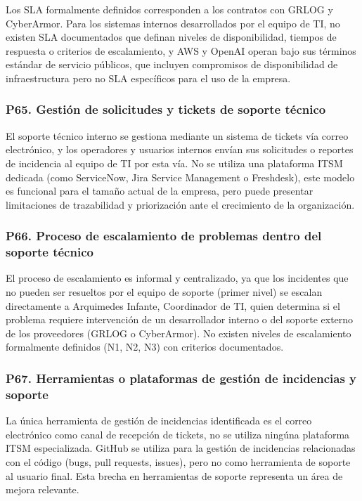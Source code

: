 \documentclass[12pt]{article}
\begin{document}
Los SLA formalmente definidos corresponden a los contratos con GRLOG y
CyberArmor. Para los sistemas internos desarrollados por el equipo de TI,
no existen SLA documentados que definan niveles de disponibilidad, tiempos de respuesta
o criterios de escalamiento, y AWS y OpenAI operan bajo sus t\'erminos est\'andar de
servicio p\'ublicos, que incluyen compromisos de disponibilidad de infraestructura pero
no SLA espec\'ificos para el uso de la empresa.

\subsubsection*{\textbf{P65. Gesti\'on de solicitudes y tickets de soporte t\'ecnico}}

El soporte t\'ecnico interno se gestiona mediante un sistema de tickets v\'ia correo
electr\'onico, y los operadores y usuarios internos env\'ian sus solicitudes o reportes de
incidencia al equipo de TI por esta v\'ia. No se utiliza una plataforma ITSM dedicada
(como ServiceNow, Jira Service Management o Freshdesk), este modelo es funcional para
el tama\~no actual de la empresa, pero puede presentar limitaciones de trazabilidad y
priorizaci\'on ante el crecimiento de la organizaci\'on.

\subsubsection*{\textbf{P66. Proceso de escalamiento de problemas dentro del soporte t\'ecnico}}

El proceso de escalamiento es informal y centralizado, ya que los incidentes que no pueden ser
resueltos por el equipo de soporte (primer nivel) se escalan directamente a
Arquimedes Infante, Coordinador de TI, quien determina si el problema requiere
intervenci\'on de un desarrollador interno o del soporte externo de los proveedores
(GRLOG o CyberArmor). No existen niveles de escalamiento formalmente definidos (N1, N2, N3)
con criterios documentados.

\subsubsection*{\textbf{P67. Herramientas o plataformas de gesti\'on de incidencias y soporte}}

La \'unica herramienta de gesti\'on de incidencias identificada es el correo
electr\'onico como canal de recepci\'on de tickets, no se utiliza ning\'una plataforma
ITSM especializada. GitHub se utiliza para la gesti\'on de incidencias relacionadas con
el c\'odigo (bugs, pull requests, issues), pero no como herramienta de soporte al usuario
final. Esta brecha en herramientas de soporte representa un \'area de mejora relevante.
\end{document}
